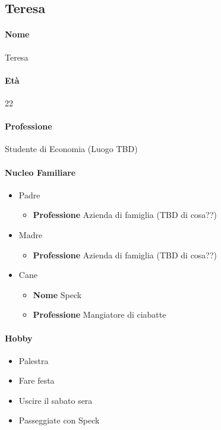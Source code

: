 \documentclass[../../UUX_Personas.tex]{subfiles}
\begin{document}
	\subsection{Teresa}
	\paragraph{Nome} Teresa
	\paragraph{Età} 22
	\paragraph{Professione} Studente di Economia (Luogo TBD)
	\paragraph{Nucleo Familiare}
	\begin{itemize}
		\item Padre
		\begin{itemize} 
			\item \textbf{Professione} Azienda di famiglia (TBD di cosa??) 
		\end{itemize}
		\item Madre
		\begin{itemize}
			\item \textbf{Professione} Azienda di famiglia (TBD di cosa??)  
		\end{itemize}
		\item Cane
		\begin{itemize}
			\item \textbf{Nome} Speck
			\item \textbf{Professione} Mangiatore di ciabatte 
		\end{itemize}
	\end{itemize}
	\paragraph{Hobby}
	\begin{itemize}
		\begin{itemize}
			\item Palestra
			\item Fare festa
			\item Uscire il sabato sera
			\item Passeggiate con Speck
		\end{itemize}
	\end{itemize}
\end{document}
